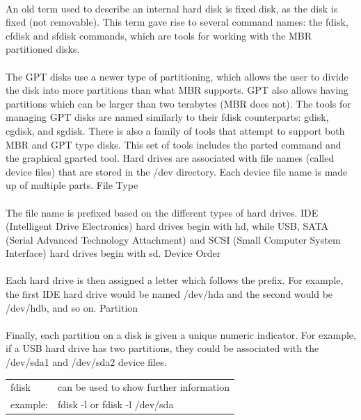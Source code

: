 \documentclass[10pt]{article}
\begin{document}
\paragraph{}
An old term used to describe an internal hard disk is fixed disk, as the disk is fixed (not removable). This term gave rise to several command names: the fdisk, cfdisk and sfdisk commands, which are tools for working with the MBR partitioned disks.

\paragraph{}
The GPT disks use a newer type of partitioning, which allows the user to divide the disk into more partitions than what MBR supports. GPT also allows having partitions which can be larger than two terabytes (MBR does not). The tools for managing GPT disks are named similarly to their fdisk counterparts: gdisk, cgdisk, and sgdisk.
There is also a family of tools that attempt to support both MBR and GPT type disks. This set of tools includes the parted command and the graphical gparted tool.
Hard drives are associated with file names (called device files) that are stored in the /dev directory. Each device file name is made up of multiple parts.
File Type
\paragraph{}
The file name is prefixed based on the different types of hard drives. IDE (Intelligent Drive Electronics) hard drives begin with hd, while USB, SATA (Serial Advanced Technology Attachment) and SCSI (Small Computer System Interface) hard drives begin with sd.
Device Order
\paragraph{}
Each hard drive is then assigned a letter which follows the prefix. For example, the first IDE hard drive would be named /dev/hda and the second would be /dev/hdb, and so on.
Partition
\paragraph{}
Finally, each partition on a disk is given a unique numeric indicator. For example, if a USB hard drive has two partitions, they could be associated with the /dev/sda1 and /dev/sda2 device files.
\\
\begin{tabular}{l l}
	fdisk & can be used to show further information\\
	example: & fdisk -l or fdisk -l /dev/sda\\
\end{tabular}
\end{document}
